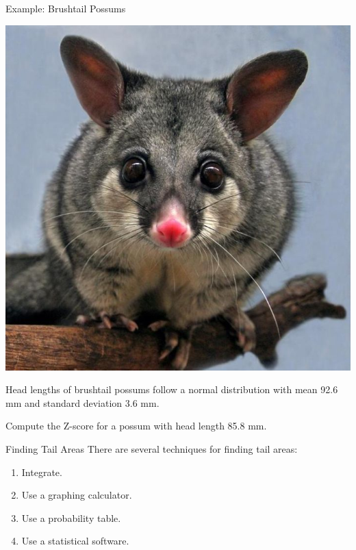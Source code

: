 \begin{frame}{Example: Brushtail Possums}
    \begin{center}
        \includegraphics[scale=0.2]{images/possum.jpg}
    \end{center}
    Head lengths of brushtail possums follow a normal distribution with mean 92.6 mm and standard deviation 3.6 mm. 
    
    \vspace{12pt}Compute the Z-score for a possum with head length 85.8 mm.
\end{frame}

\begin{frame}{Finding Tail Areas}
    There are several techniques for finding tail areas:
    \begin{enumerate}
        \item Integrate.
        \item Use a graphing calculator.
        \item Use a probability table.
        \item Use a statistical software.
    \end{enumerate}
\end{frame}

